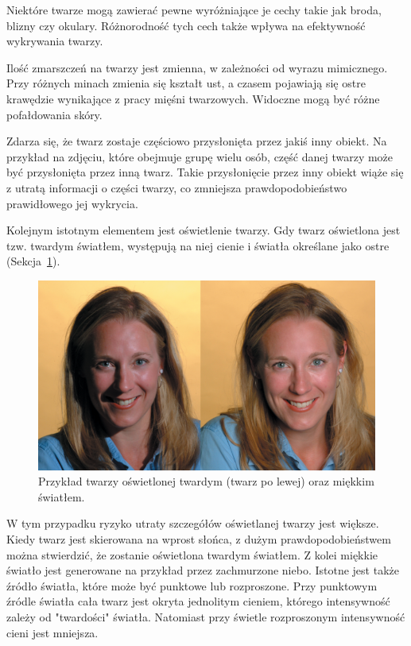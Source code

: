 \documentclass[a4paper,twoside,12pt]{book}
\begin{document}
    Niektóre twarze mogą zawierać pewne wyróżniające je cechy takie jak broda, blizny czy okulary.
    Różnorodność tych cech także wpływa na efektywność wykrywania twarzy.

    Ilość zmarszczeń na twarzy jest zmienna, w zależności od wyrazu mimicznego.
    Przy różnych minach zmienia się kształt ust, a czasem pojawiają się ostre krawędzie wynikające z pracy mięśni twarzowych.
    Widoczne mogą być różne pofałdowania skóry.

    Zdarza się, że twarz zostaje częściowo przysłonięta przez jakiś inny obiekt.
    Na przykład na zdjęciu,
    które obejmuje grupę wielu osób, część danej twarzy może być przysłonięta przez inną twarz.
    Takie przysłonięcie przez inny obiekt wiąże się z utratą informacji o części twarzy, co zmniejsza prawdopodobieństwo
    prawidłowego jej wykrycia.

    Kolejnym istotnym elementem jest oświetlenie twarzy.
    Gdy twarz oświetlona jest tzw. twardym światłem, występują na
    niej cienie i światła określane jako ostre (Sekcja~\ref{fig.oswietlenieTwarzy}).
    \begin{figure}
        \centering
        \includegraphics[width=12cm]{Obrazy/oswietlenieTwarzy.jpg}
        \caption{Przykład twarzy oświetlonej twardym (twarz po lewej) oraz miękkim światłem.~\cite{oswietlenieTwarzy}}
        \label{fig.oswietlenieTwarzy}
    \end{figure}
    W tym przypadku ryzyko utraty szczegółów oświetlanej twarzy jest większe.
    Kiedy twarz jest skierowana na wprost słońca, z dużym
    prawdopodobieństwem można stwierdzić, że zostanie oświetlona twardym światłem.
    Z kolei miękkie światło jest generowane na przykład przez zachmurzone niebo.
    Istotne jest także źródło światła, które
    może być punktowe lub rozproszone.
    Przy punktowym źródle światła cała twarz jest
    okryta jednolitym cieniem, którego intensywność zależy od "twardości" światła.
    Natomiast przy świetle rozproszonym intensywność cieni jest mniejsza.
\end{document}
